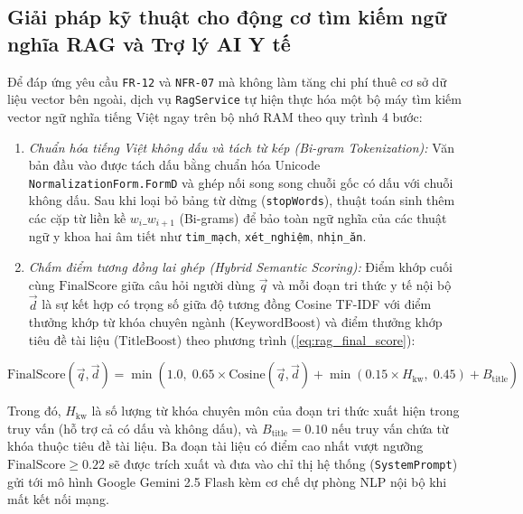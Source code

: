 \subsection{Giải pháp kỹ thuật cho động cơ tìm kiếm ngữ nghĩa RAG và Trợ lý AI Y tế}

Để đáp ứng yêu cầu \texttt{FR-12} và \texttt{NFR-07} mà không làm tăng chi phí thuê cơ sở dữ liệu vector bên ngoài, dịch vụ \texttt{RagService} tự hiện thực hóa một bộ máy tìm kiếm vector ngữ nghĩa tiếng Việt ngay trên bộ nhớ RAM theo quy trình 4 bước:
\begin{enumerate}
    \item \textit{Chuẩn hóa tiếng Việt không dấu và tách từ kép (Bi-gram Tokenization):} Văn bản đầu vào được tách dấu bằng chuẩn hóa Unicode \texttt{NormalizationForm.FormD} và ghép nối song song chuỗi gốc có dấu với chuỗi không dấu. Sau khi loại bỏ bảng từ dừng (\texttt{stopWords}), thuật toán sinh thêm các cặp từ liền kề $w_i\_w_{i+1}$ (Bi-grams) để bảo toàn ngữ nghĩa của các thuật ngữ y khoa hai âm tiết như \texttt{tim\_mạch}, \texttt{xét\_nghiệm}, \texttt{nhịn\_ăn}.
    \item \textit{Chấm điểm tương đồng lai ghép (Hybrid Semantic Scoring):} Điểm khớp cuối cùng $\text{FinalScore}$ giữa câu hỏi người dùng $\vec{q}$ và mỗi đoạn tri thức y tế nội bộ $\vec{d}$ là sự kết hợp có trọng số giữa độ tương đồng Cosine TF-IDF với điểm thưởng khớp từ khóa chuyên ngành ($\text{KeywordBoost}$) và điểm thưởng khớp tiêu đề tài liệu ($\text{TitleBoost}$) theo phương trình (\ref{eq:rag_final_score}):
\end{enumerate}

\begin{equation}
\label{eq:rag_final_score}
\text{FinalScore}(\vec{q}, \vec{d}) = \min \left( 1.0,\; 0.65 \times \text{Cosine}(\vec{q}, \vec{d}) + \min(0.15 \times H_{\text{kw}},\; 0.45) + B_{\text{title}} \right)
\end{equation}

Trong đó, $H_{\text{kw}}$ là số lượng từ khóa chuyên môn của đoạn tri thức xuất hiện trong truy vấn (hỗ trợ cả có dấu và không dấu), và $B_{\text{title}} = 0.10$ nếu truy vấn chứa từ khóa thuộc tiêu đề tài liệu. Ba đoạn tài liệu có điểm cao nhất vượt ngưỡng $\text{FinalScore} \ge 0.22$ sẽ được trích xuất và đưa vào chỉ thị hệ thống (\texttt{SystemPrompt}) gửi tới mô hình Google Gemini 2.5 Flash kèm cơ chế dự phòng NLP nội bộ khi mất kết nối mạng.
